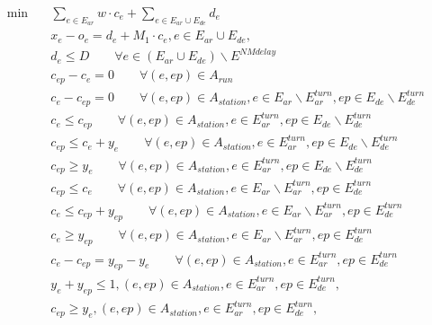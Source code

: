 \begin{align}
  \min\quad & \sum_{e \in E_{ar}} w \cdot c_{e} + \sum_{e \in E_{ar} \cup E_{de}} d_{e} \tag{eq\_0006} \\
  & x_{e} - o_{e} = d_{e} + M_{1} \cdot c_{e} , e \in E_{ar} \cup E_{de} , \tag{eq\_0009} \\
  & d_{e} \le D \qquad \forall e \in (E_{ar} \cup E_{de}) \backslash E^{NMdelay} \tag{eq\_0011} \\
  & c_{ep} - c_{e} = 0 \qquad \forall (e, ep) \in A_{run} \tag{eq\_0013} \\
  & c_{e} - c_{ep} = 0 \qquad \forall (e, ep) \in A_{station}, e \in E_{ar} \backslash E_{ar}^{turn}, ep \in E_{de} \backslash E_{de}^{turn} \tag{eq\_0014} \\
  & c_{e} \le c_{ep} \qquad \forall (e,ep) \in A_{station}, e \in E_{ar}^{turn}, ep \in E_{de} \backslash E_{de}^{turn} \tag{eq\_0015} \\
  & c_{ep} \le c_{e} + y_{e} \qquad \forall (e,ep) \in A_{station}, e \in E_{ar}^{turn}, ep \in E_{de} \backslash E_{de}^{turn} \tag{eq\_0017} \\
  & c_{ep} \ge y_{e} \qquad \forall (e,ep) \in A_{station}, e \in E_{ar}^{turn}, ep \in E_{de} \backslash E_{de}^{turn} \tag{eq\_0018} \\
  & c_{ep} \le c_{e} \qquad \forall (e,ep) \in A_{station}, e \in E_{ar} \backslash E_{ar}^{turn}, ep \in E_{de}^{turn} \tag{eq\_0019} \\
  & c_{e} \le c_{ep} + y_{ep} \qquad \forall (e,ep) \in A_{station}, e \in E_{ar} \backslash E_{ar}^{turn}, ep \in E_{de}^{turn} \tag{eq\_0020} \\
  & c_{e} \ge y_{ep} \qquad \forall (e,ep) \in A_{station}, e \in E_{ar} \backslash E_{ar}^{turn}, ep \in E_{de}^{turn} \tag{eq\_0021} \\
  & c_{e} - c_{ep} = y_{ep} - y_{e} \qquad \forall (e,ep) \in A_{station}, e \in E_{ar}^{turn}, ep \in E_{de}^{turn} \tag{eq\_0022} \\
  & y_{e} + y_{ep} \leq 1 , \left(e , ep\right) \in A_{station} , e \in E_{ar}^{turn} , ep \in E_{de}^{turn} , \tag{eq\_0024} \\
  & c_{ep} \geq y_{e} , \left(e , ep\right) \in A_{station} , e \in E_{ar}^{turn} , ep \in E_{de}^{turn} , \tag{eq\_0025} \\

\end{align}
